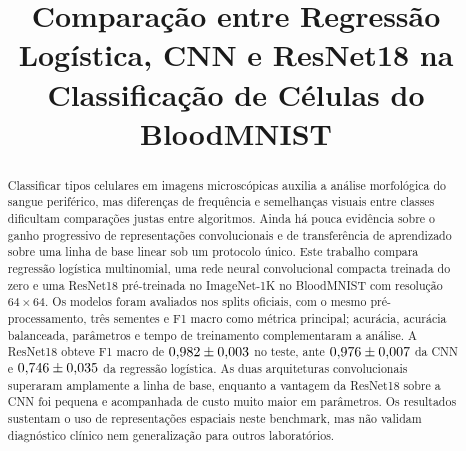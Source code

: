 \documentclass[conference]{IEEEtran}
\begin{document}
\title{Comparação entre Regressão Logística, CNN e ResNet18 na Classificação de Células do BloodMNIST}

\author{
\and
{}
}

\maketitle

\begin{abstract}
Classificar tipos celulares em imagens microscópicas auxilia a análise morfológica do sangue periférico, mas diferenças de frequência e semelhanças visuais entre classes dificultam comparações justas entre algoritmos.
Ainda há pouca evidência sobre o ganho progressivo de representações convolucionais e de transferência de aprendizado sobre uma linha de base linear sob um protocolo único.
Este trabalho compara regressão logística multinomial, uma rede neural convolucional compacta treinada do zero e uma ResNet18 pré-treinada no ImageNet-1K no BloodMNIST com resolução $64\times64$.
Os modelos foram avaliados nos splits oficiais, com o mesmo pré-processamento, três sementes e F1 macro como métrica principal; acurácia, acurácia balanceada, parâmetros e tempo de treinamento complementaram a análise.
A ResNet18 obteve F1 macro de $0{,}982 \pm 0{,}003$ no teste, ante $0{,}976 \pm 0{,}007$ da CNN e $0{,}746 \pm 0{,}035$ da regressão logística.
As duas arquiteturas convolucionais superaram amplamente a linha de base, enquanto a vantagem da ResNet18 sobre a CNN foi pequena e acompanhada de custo muito maior em parâmetros.
Os resultados sustentam o uso de representações espaciais neste benchmark, mas não validam diagnóstico clínico nem generalização para outros laboratórios.
\end{abstract}
\end{document}
